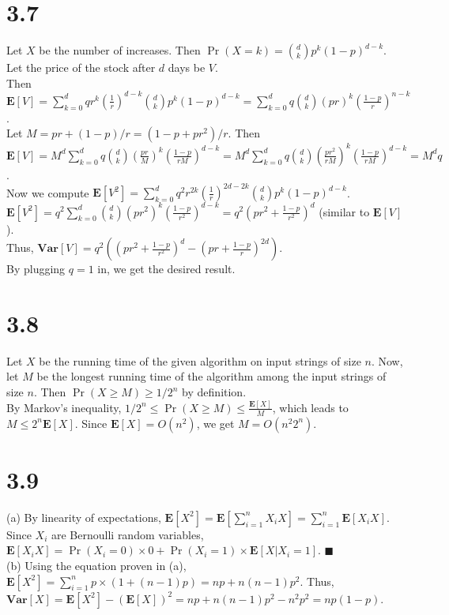 \documentclass{article}
\begin{document}
\section*{3.7}
Let $X$ be the number of increases. Then $\Pr(X=k)=\binom{d}{k}p^k(1-p)^{d-k}$.\\
Let the price of the stock after $d$ days be $V$.\\
Then $\textbf{E}[V]=\sum\limits_{k=0}^d qr^k(\frac{1}{r})^{d-k}\binom{d}{k}p^k(1-p)^{d-k}=\sum\limits_{k=0}^dq\binom{d}{k}(pr)^k(\frac{1-p}{r})^{n-k}$.\\
Let $M=pr + (1-p)/r = (1-p+pr^2)/r$. Then\\
$\textbf{E}[V]=M^d\sum\limits_{k=0}^dq\binom{d}{k}(\frac{pr}{M})^k(\frac{1-p}{rM})^{d-k}=M^d\sum\limits_{k=0}^dq\binom{d}{k}(\frac{pr^2}{rM})^k(\frac{1-p}{rM})^{d-k}=M^dq$.\\
Now we compute $\textbf{E}[V^2]=\sum\limits_{k=0}^dq^2 r^{2k}(\frac{1}{r})^{2d-2k}\binom{d}{k}p^k(1-p)^{d-k}$.\\
$\textbf{E}[V^2]=q^2\sum\limits_{k=0}^d\binom{d}{k}(pr^2)^k(\frac{1-p}{r^2})^{d-k}=q^2\left(pr^2+\frac{1-p}{r^2} \right)^d$ (similar to $\textbf{E}[V]$).\\
Thus, $\textbf{Var}[V]=q^2 \left((pr^2 + \frac{1-p}{r^2})^d - (pr + \frac{1-p}{r})^{2d}\right)$.\\
By plugging $q=1$ in, we get the desired result.
\section*{3.8}
Let $X$ be the running time of the given algorithm on input strings of size $n$.
Now, let $M$ be the longest running time of the algorithm among the input strings of size $n$. Then $\Pr(X\geq M) \geq 1/2^n$ by definition.\\
By Markov's inequality, $1/2^n \leq \Pr(X\geq M) \leq \frac{\textbf{E}[X]}{M}$, which leads to $M \leq 2^n \textbf{E}[X]$.
Since $\textbf{E}[X]=O(n^2)$, we get $M=O(n^2 2^n)$.
\section*{3.9}
(a) By linearity of expectations, $\textbf{E}[X^2]=\textbf{E}[\sum\limits_{i=1}^nX_i X]=\sum\limits_{i=1}^n\textbf{E}[X_iX]$.\\
Since $X_i$ are Bernoulli random variables, $\textbf{E}[X_iX]=\Pr(X_i=0)\times 0+\Pr(X_i=1)\times \textbf{E}[X|X_i=1]$. $\blacksquare$\\
(b) Using the equation proven in (a), $\textbf{E}[X^2]=\sum\limits_{i=1}^np\times(1+(n-1)p)=np+n(n-1)p^2$.
Thus, $\textbf{Var}[X]=\textbf{E}[X^2]-(\textbf{E}[X])^2=np+n(n-1)p^2-n^2p^2=np(1-p)$.
\end{document}
